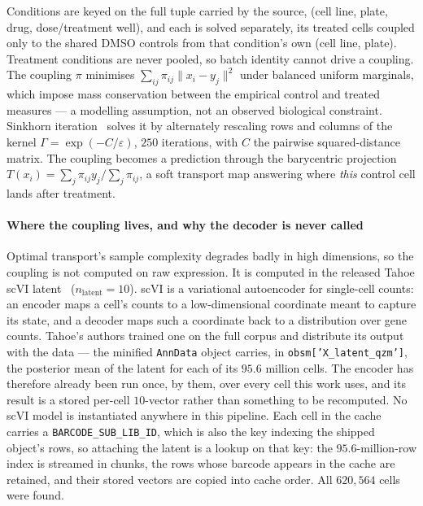 Conditions are keyed on the full tuple carried by the source, (cell line, plate,
drug, dose/treatment well), and each is solved separately, its treated cells
coupled only to the shared DMSO controls from that condition's own (cell line,
plate). Treatment conditions are never pooled, so batch identity cannot drive a
coupling. The coupling $\pi$ minimises $\sum_{ij}\pi_{ij}\lVert x_i - y_j\rVert^2$
under balanced uniform marginals, which impose mass conservation between the
empirical control and treated measures --- a modelling assumption, not an observed
biological constraint. Sinkhorn iteration~\cite{cuturi} solves it by alternately
rescaling rows and columns of the kernel $\Gamma = \exp(-C/\varepsilon)$, $250$
iterations, with $C$ the pairwise squared-distance matrix. The coupling becomes a
prediction through the barycentric projection
$T(x_i) = \sum_j \pi_{ij} y_j \big/ \sum_j \pi_{ij}$, a soft transport map
answering where \emph{this} control cell lands after treatment.

\paragraph{Where the coupling lives, and why the decoder is never called}
Optimal transport's sample complexity degrades badly in high dimensions, so the
coupling is not computed on raw expression. It is computed in the released Tahoe
scVI latent~\cite{scvi} ($n_{\textrm{latent}} = 10$). scVI is a variational
autoencoder for single-cell counts: an encoder maps a cell's counts to a
low-dimensional coordinate meant to capture its state, and a decoder maps such a
coordinate back to a distribution over gene counts. Tahoe's authors trained one
on the full corpus and distribute its output with the data --- the minified
\texttt{AnnData} object carries, in \texttt{obsm['X\_latent\_qzm']}, the posterior
mean of the latent for each of its $95.6$ million cells. The encoder has therefore
already been run once, by them, over every cell this work uses, and its result is
a stored per-cell $10$-vector rather than something to be recomputed. No scVI
model is instantiated anywhere in this pipeline. Each cell in the cache carries a
\texttt{BARCODE\_SUB\_LIB\_ID}, which is also the key indexing the shipped object's
rows, so attaching the latent is a lookup on that key: the $95.6$-million-row index
is streamed in chunks, the rows whose barcode appears in the cache are retained,
and their stored vectors are copied into cache order. All $620{,}564$ cells were
found.

